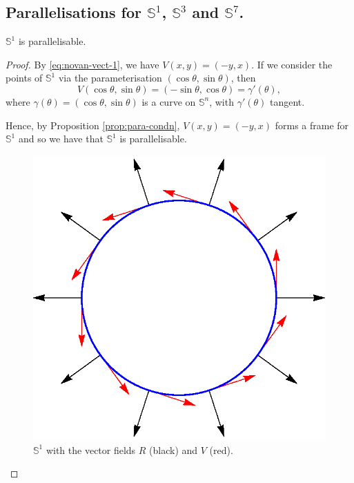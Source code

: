 \subsection{Parallelisations for $\mathbb{S}^1$, $\mathbb{S}^3$ and $\mathbb{S}^7$.}
\begin{proposition}
$\mathbb{S}^1$ is parallelisable.
\end{proposition}
\begin{proof}
By \eqref{eq:novan-vect-1}, we have $V(x,y)=(-y,x)$. If we consider the points of $\mathbb{S}^1$ via the parameterisation $(\cos\theta,\sin\theta)$, then
\[
V(\cos\theta,\sin\theta)=(-\sin\theta,\cos\theta)=\gamma'(\theta),
\] 
where $\gamma(\theta)=(\cos\theta,\sin\theta)$ is a curve on $\mathbb{S}^n$, with $\gamma'(\theta)$ tangent.

Hence, by Proposition \ref{prop:para-condn}, $V(x,y)=(-y,x)$ forms a frame for $\mathbb{S}^1$ and so we have that $\mathbb{S}^1$ is parallelisable.

\begin{figure}[h!]
\centering
\includegraphics[scale=0.75]{fig/s1-norm-tang}
\caption{$\mathbb{S}^1$ with the vector fields $R$ (black) and $V$ (red).}
\label{fig:s1+norm+tang}
\end{figure}
\end{proof}

